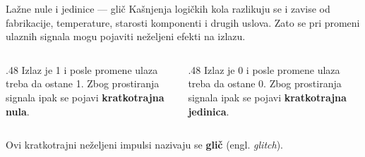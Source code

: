 \begin{frame}[label=02-s050]{Lažne nule i jedinice — glič}
\setlength{\parskip}{0pt}
Kašnjenja logičkih kola razlikuju se i zavise od fabrikacije, temperature, starosti komponenti i drugih uslova. Zato se pri promeni ulaznih signala mogu pojaviti neželjeni efekti na izlazu.
\par\vspace{2mm}
\begin{columns}[T,onlytextwidth]
\begin{column}{.48\textwidth}
Izlaz je 1 i posle promene ulaza treba da ostane 1. Zbog prostiranja signala ipak se pojavi \alert{\textbf{kratkotrajna nula}}.
\end{column}
\begin{column}{.48\textwidth}
Izlaz je 0 i posle promene ulaza treba da ostane 0. Zbog prostiranja signala ipak se pojavi \alert{\textbf{kratkotrajna jedinica}}.
\end{column}
\end{columns}
\par\vspace{2mm}
Ovi kratkotrajni neželjeni impulsi nazivaju se \alert{\textbf{glič}} (engl. \emph{glitch}).
\par\vspace{1mm}
{\centering\par}
\end{frame}
